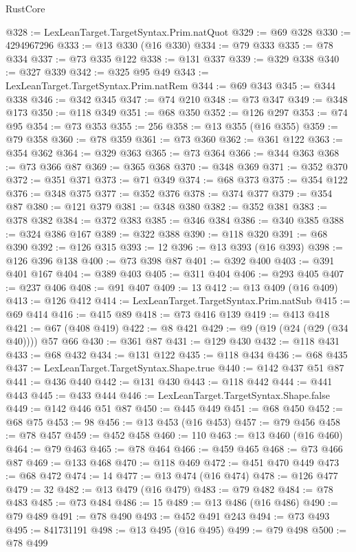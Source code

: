 \begin{lexlean}{RustCore}
\begin{coremodule}
@328 := LexLeanTarget.TargetSyntax.Prim.natQuot
@329 := @69 @328
@330 := 4294967296
@333 := @13 @330 (@16 @330)
@334 := @79 @333
@335 := @78 @334
@337 := @73 @335 @122
@338 := @131 @337
@339 := @329 @338
@340 := @327 @339
@342 := @325 @95 @49
@343 := LexLeanTarget.TargetSyntax.Prim.natRem
@344 := @69 @343
@345 := @344 @338
@346 := @342 @345
@347 := @74 @210
@348 := @73 @347
@349 := @348 @173
@350 := @118 @349
@351 := @68 @350
@352 := @126 @297
@353 := @74 @95
@354 := @73 @353
@355 := 256
@358 := @13 @355 (@16 @355)
@359 := @79 @358
@360 := @78 @359
@361 := @73 @360
@362 := @361 @122
@363 := @354 @362
@364 := @329 @363
@365 := @73 @364
@366 := @344 @363
@368 := @73 @366 @87
@369 := @365 @368
@370 := @348 @369
@371 := @352 @370
@372 := @351 @371
@373 := @71 @349
@374 := @68 @373
@375 := @354 @122
@376 := @348 @375
@377 := @352 @376
@378 := @374 @377
@379 := @354 @87
@380 := @121 @379
@381 := @348 @380
@382 := @352 @381
@383 := @378 @382
@384 := @372 @383
@385 := @346 @384
@386 := @340 @385
@388 := @324 @386 @167
@389 := @322 @388
@390 := @118 @320
@391 := @68 @390
@392 := @126 @315
@393 := 12
@396 := @13 @393 (@16 @393)
@398 := @126 @396 @138
@400 := @73 @398 @87
@401 := @392 @400
@403 := @391 @401 @167
@404 := @389 @403
@405 := @311 @404
@406 := @293 @405
@407 := @237 @406
@408 := @91 @407
@409 := 13
@412 := @13 @409 (@16 @409)
@413 := @126 @412
@414 := LexLeanTarget.TargetSyntax.Prim.natSub
@415 := @69 @414
@416 := @415 @89
@418 := @73 @416 @139
@419 := @413 @418
@421 := @67 (@408 @419)
@422 := @8 @421
@429 := @9 (@19 (@24 (@29 (@34 @40)))) @57 @66
@430 := @361 @87
@431 := @129 @430
@432 := @118 @431
@433 := @68 @432
@434 := @131 @122
@435 := @118 @434
@436 := @68 @435
@437 := LexLeanTarget.TargetSyntax.Shape.true
@440 := @142 @437 @51 @87
@441 := @436 @440
@442 := @131 @430
@443 := @118 @442
@444 := @441 @443
@445 := @433 @444
@446 := LexLeanTarget.TargetSyntax.Shape.false
@449 := @142 @446 @51 @87
@450 := @445 @449
@451 := @68 @450
@452 := @68 @75
@453 := 98
@456 := @13 @453 (@16 @453)
@457 := @79 @456
@458 := @78 @457
@459 := @452 @458
@460 := 110
@463 := @13 @460 (@16 @460)
@464 := @79 @463
@465 := @78 @464
@466 := @459 @465
@468 := @73 @466 @87
@469 := @133 @468
@470 := @118 @469
@472 := @451 @470 @449
@473 := @68 @472
@474 := 14
@477 := @13 @474 (@16 @474)
@478 := @126 @477
@479 := 32
@482 := @13 @479 (@16 @479)
@483 := @79 @482
@484 := @78 @483
@485 := @73 @484
@486 := 15
@489 := @13 @486 (@16 @486)
@490 := @79 @489
@491 := @78 @490
@493 := @452 @491 @243
@494 := @73 @493
@495 := 841731191
@498 := @13 @495 (@16 @495)
@499 := @79 @498
@500 := @78 @499

\end{coremodule}
\end{lexlean}
